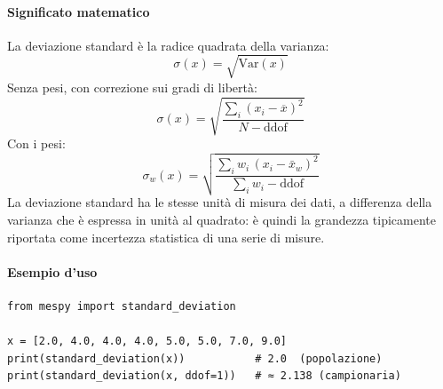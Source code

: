\paragraph{Significato matematico}
La deviazione standard è la radice quadrata della varianza:
$$\sigma(x) = \sqrt{\text{Var}(x)}$$
Senza pesi, con correzione sui gradi di libertà:
$$\sigma(x) = \sqrt{\frac{\sum_i (x_i - \overline{x})^2}{N - \text{ddof}}}$$
Con i pesi:
$$\sigma_w(x) = \sqrt{\frac{\sum_i w_i \, (x_i - \bar{x}_w)^2}{\sum_i w_i - \text{ddof}}}$$
La deviazione standard ha le stesse unità di misura dei dati, a differenza della
varianza che è espressa in unità al quadrato: è quindi la grandezza tipicamente
riportata come incertezza statistica di una serie di misure.

\paragraph{Esempio d'uso}
\begin{verbatim}
from mespy import standard_deviation

x = [2.0, 4.0, 4.0, 4.0, 5.0, 5.0, 7.0, 9.0]
print(standard_deviation(x))           # 2.0  (popolazione)
print(standard_deviation(x, ddof=1))   # ≈ 2.138 (campionaria)
\end{verbatim}
